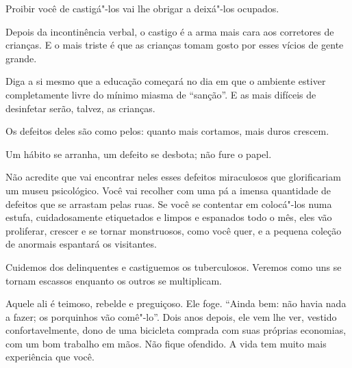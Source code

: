 Proibir você de castigá"-los vai lhe obrigar a deixá"-los ocupados.

\bigskip
\bigskip

Depois da incontinência verbal, o castigo é a arma mais cara aos
corretores de crianças. E o mais triste é que as crianças tomam gosto
por esses vícios de gente grande.

\bigskip
\bigskip

Diga a si mesmo que a educação começará no dia em que o ambiente estiver
completamente livre do mínimo miasma de ``sanção''. E as mais difíceis
de desinfetar serão, talvez, as crianças.

\bigskip
\bigskip

Os defeitos deles são como pelos: quanto mais cortamos, mais duros
crescem.

\bigskip
\bigskip

Um hábito se arranha, um defeito se desbota; não fure o papel.

\bigskip
\bigskip

Não acredite que vai encontrar neles esses defeitos miraculosos que
glorificariam um museu psicológico. Você vai recolher com uma pá a
imensa quantidade de defeitos que se arrastam pelas ruas. Se você se
contentar em colocá"-los numa estufa, cuidadosamente etiquetados e limpos
e espanados todo o mês, eles vão proliferar, crescer e se tornar
monstruosos, como você quer, e a pequena coleção de anormais espantará
os visitantes.

\bigskip
\bigskip

Cuidemos dos delinquentes e castiguemos os tuberculosos. Veremos como
uns se tornam escassos enquanto os outros se multiplicam.

\bigskip
\bigskip

Aquele ali é teimoso, rebelde e preguiçoso. Ele foge. ``Ainda bem: não
havia nada a fazer; os porquinhos vão comê"-lo''. Dois anos depois, ele
vem lhe ver, vestido confortavelmente, dono de uma bicicleta comprada
com suas próprias economias, com um bom trabalho em mãos. Não fique
ofendido. A vida tem muito mais experiência que você.

\bigskip
\bigskip

